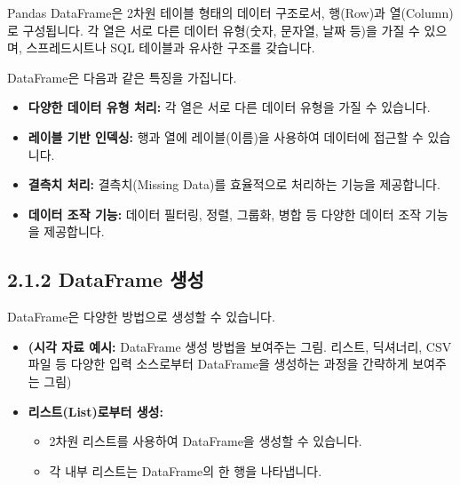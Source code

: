 \documentclass[
  letterpaper,
]{book}
\providecommand{\tightlist}{%
  \setlength{\itemsep}{0pt}\setlength{\parskip}{0pt}}
\begin{document}
Pandas DataFrame은 2차원 테이블 형태의 데이터 구조로서, 행(Row)과
열(Column)로 구성됩니다. 각 열은 서로 다른 데이터 유형(숫자, 문자열,
날짜 등)을 가질 수 있으며, 스프레드시트나 SQL 테이블과 유사한 구조를
갖습니다.

DataFrame은 다음과 같은 특징을 가집니다.

\begin{itemize}
\tightlist
\item
  \textbf{다양한 데이터 유형 처리:} 각 열은 서로 다른 데이터 유형을 가질
  수 있습니다.
\item
  \textbf{레이블 기반 인덱싱:} 행과 열에 레이블(이름)을 사용하여
  데이터에 접근할 수 있습니다.
\item
  \textbf{결측치 처리:} 결측치(Missing Data)를 효율적으로 처리하는
  기능을 제공합니다.
\item
  \textbf{데이터 조작 기능:} 데이터 필터링, 정렬, 그룹화, 병합 등 다양한
  데이터 조작 기능을 제공합니다.
\end{itemize}

\subsection{2.1.2 DataFrame 생성}\label{dataframe-uxc0dduxc131}

DataFrame은 다양한 방법으로 생성할 수 있습니다.

\begin{itemize}
\item
  \textbf{(시각 자료 예시:} DataFrame 생성 방법을 보여주는 그림. 리스트,
  딕셔너리, CSV 파일 등 다양한 입력 소스로부터 DataFrame을 생성하는
  과정을 간략하게 보여주는 그림)
\item
  \textbf{리스트(List)로부터 생성:}

  \begin{itemize}
  \tightlist
  \item
    2차원 리스트를 사용하여 DataFrame을 생성할 수 있습니다.
  \item
    각 내부 리스트는 DataFrame의 한 행을 나타냅니다.
  \end{itemize}
\end{itemize}
\end{document}
